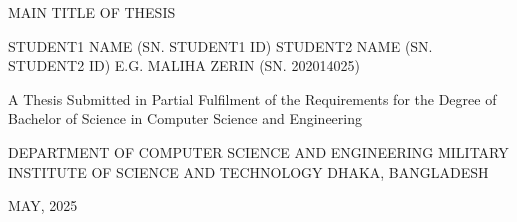 \documentclass[12pt]{report}
\begin{document}
\hypersetup{citecolor=black}
\begin{singlespace}
\begin{center}
\begingroup
\fontsize{18pt}{18pt}\selectfont
MAIN TITLE OF THESIS

\end{center}



\vspace{\dimexpr23.25mm-\baselineskip}
\centering
\fontsize{16pt}{16pt}\selectfont
STUDENT1 NAME (SN. STUDENT1 ID)\linebreak 
STUDENT2 NAME (SN. STUDENT2 ID)\linebreak
E.G. MALIHA ZERIN  (SN. 202014025)\linebreak




\vspace{\dimexpr25.08mm-\baselineskip}
\centering 
\fontsize{16pt}{16pt}\selectfont
A Thesis Submitted in Partial Fulfilment of the Requirements for the
Degree of Bachelor of Science in Computer Science and Engineering\linebreak
\vspace{\dimexpr25mm-\baselineskip}



\centering


\vspace{\dimexpr8mm-\baselineskip}

\thispagestyle{empty}
\centering
\fontsize{16pt}{16pt}\selectfont
DEPARTMENT OF COMPUTER SCIENCE AND ENGINEERING\linebreak
MILITARY INSTITUTE OF SCIENCE AND TECHNOLOGY\linebreak
DHAKA, BANGLADESH
 
\centering
\fontsize{16pt}{16pt}\selectfont
\newline\bigskip
MAY, 2025
 \par
\endgroup



\end{singlespace}




\thesiscertificationpage
\thispagestyle{empty}
\newpage
\thispagestyle{empty}
\thesiscandidatesdeclaration
\thispagestyle{empty}
\newpage
{}
\setcounter{page}{1}

\newpage %

\newpage

\end{document}
